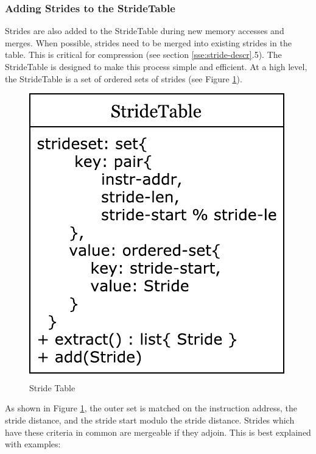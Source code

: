 \documentclass[12pt,twoside]{reedthesis}
\begin{document}
			
		
		\subsubsection{Adding Strides to the StrideTable}
			
			Strides are also added to the StrideTable during new memory accesses and merges. 			
			When possible, strides need to be merged into existing strides in the table. This is critical for compression (see section \ref{sse:stride-descr}.5). The StrideTable is designed to make this process simple and efficient. 
			At a high level, the StrideTable is a set of ordered sets of strides (see Figure \ref{fig:stride-table}). %
			
			\begin{figure}
				\caption{Stride Table}
				\label{fig:stride-table}
				\includegraphics[scale=0.8]{stride_data.pdf}
			\end{figure}
			 
			
			As shown in Figure \ref{fig:stride-table}, the outer set is matched on the instruction address, the stride distance, and the stride start modulo the stride distance. Strides which have these criteria in common are mergeable if they adjoin.  This is best explained with examples:
			
\end{document}

